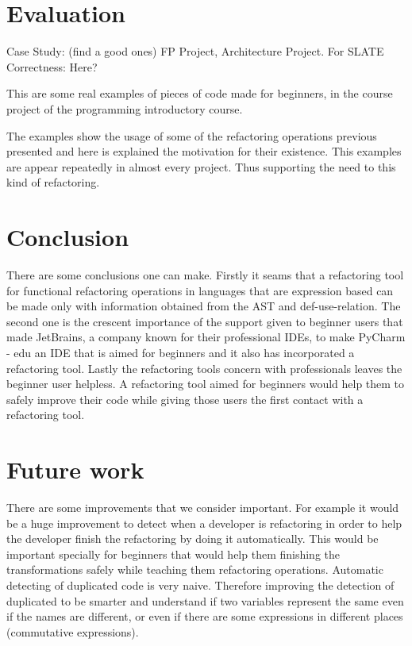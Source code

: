 \section{Evaluation} %
Case Study: (find a good ones) FP Project, Architecture Project. For SLATE
Correctness: Here?


This are some real examples of pieces of code made for beginners, in the course
project of the programming introductory course.


The examples show the usage of some of the refactoring operations previous presented
and here is explained the motivation for their existence.
This examples are appear repeatedly in almost every project. Thus supporting
the need to this kind of refactoring.


\section{Conclusion}


There are some conclusions one can make. Firstly it seams that a refactoring %
tool for functional refactoring operations in languages that are expression based
can be made only with information obtained from the AST and def-use-relation.
The second one is the crescent importance of the support given to beginner users %
that made JetBrains, a company known for their professional IDEs, to make PyCharm - edu
 an IDE that is aimed for beginners and it also has incorporated a refactoring tool.
 Lastly the refactoring tools concern with professionals leaves the beginner
 user helpless.
 A refactoring tool aimed for beginners would help them to safely improve %
 their code while giving those users the first contact with a refactoring tool.




\section{Future work}
There are some improvements that we consider important. For example it would
be a huge improvement to detect when a developer is refactoring in order to help the developer finish the
refactoring by doing it automatically.
This would be important specially for beginners that would help them finishing
the transformations safely while teaching them refactoring operations. %
Automatic detecting of duplicated code is very naive.
Therefore improving the detection of duplicated to be smarter and understand if
two variables represent the same even if the names are different, or even if there
are some expressions in different places (commutative expressions). %

